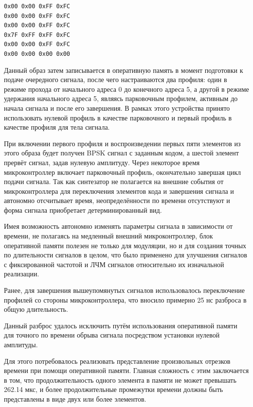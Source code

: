 \documentclass[rusmathsym, eqnumwithinsec, amspack, hyperref]{bomgost}
\begin{document}
\lstset{
	language=c,
	basicstyle=\scriptsize\ttfamily,
	numbers=left,
	stepnumber=1,
	showstringspaces=false,
	tabsize=4,
	breaklines=true,
	breakatwhitespace=false,
	xleftmargin=.1\textwidth, xrightmargin=.1\textwidth,
	belowskip=1em, aboveskip=1em
}
\begin{lstlisting}[firstnumber=0]
0x00 0x00 0xFF 0xFC
0x00 0x00 0xFF 0xFC
0x00 0x00 0xFF 0xFC
0x7F 0xFF 0xFF 0xFC
0x00 0x00 0xFF 0xFC
0x00 0x00 0x00 0x00
\end{lstlisting}

Данный образ затем записывается в оперативную память в момент подготовки к подаче очередного сигнала, после чего настраиваются два профиля: один в режиме прохода от начального адреса 0 до конечного адреса 5, а другой в режиме удержания начального адреса 5, являясь парковочным профилем, активным до начала сигнала и после его завершения. В рамках этого устройства принято использовать нулевой профиль в качестве парковочного и первый профиль в качестве профиля для тела сигнала.

При включении первого профиля и воспроизведении первых пяти элементов из этого образа будет получен BPSK сигнал с заданным кодом, а шестой элемент прервёт сигнал, задав нулевую амплитуду. Через некоторое время микроконтроллер включает парковочный профиль, окончательно завершая цикл подачи сигнала. Так как синтезатор не полагается на внешние события от микроконтроллера для переключения элементов кода и завершения сигнала и автономно отсчитывает время, неопределённости по времени отсутствуют и форма сигнала приобретает детерминированный вид.


Имея возможность автономно изменять параметры сигнала в зависимости от времени, не полагаясь на медленный внешний микроконтроллер, блок оперативной памяти полезен не только для модуляции, но и для создания точных по длительности сигналов в целом, что было применено для улучшения сигналов с фиксированной частотой и ЛЧМ сигналов относительно их изначальной реализации.

Ранее, для завершения вышеупомянутых сигналов использовалось переключение профилей со стороны микроконтроллера, что вносило примерно 25 нс разброса в общую длительность.

Данный разброс удалось исключить путём использования оперативной памяти для точного по времени обрыва сигнала посредством установки нулевой амплитуды.

Для этого потребовалось реализовать представление произвольных отрезков времени при помощи оперативной памяти. Главная сложность с этим заключается в том, что продолжительность одного элемента в памяти не может превышать 262.14 мкс, и более продолжительные промежутки времени должны быть представлены в виде двух или более элементов.
\end{document}
